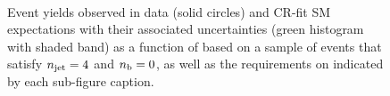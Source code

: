 \begin{figure}[h!]
\begin{center}
    \\
    \caption{Event yields observed in data (solid circles) and CR-fit SM expectations with their associated uncertainties (green histogram with shaded band) as a function of \HTmiss based on a sample of events that satisfy $n_{\text{jet}} = 4$ and $n_{\text{b}} = 0$, as well as the requirements on \scalht indicated by each sub-figure caption. }
    \label{fig:mhtval_eq4j_eq0b}
  \end{center}
\end{figure}

